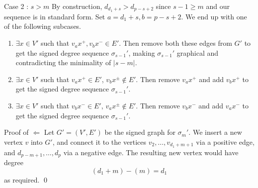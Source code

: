 \begin{frame}{Case 2 : $s > m$}
	By construction, $d_{d_1+s} > d_{p-s+2}$ since $s-1 \geq m$ and our sequence is in standard form. Set $a = d_1+s, b = p-s+2$. We end up with one of the following subcases.
	\begin{enumerate}
		\item $\exists x \in V'$ such that $v_ax^{+}, v_bx^{-} \in E'$. Then remove both these edges from $G'$ to get the signed degree sequence $\sigma_{s-1}'$, making $\sigma_{s-1}'$ graphical and contradicting the minimality of $|s - m|$.
		\item $\exists x \in V'$ such that $v_ax^{+} \in E'$, $v_bx^{\pm} \notin E'$. Then remove $v_ax^{+}$ and add $v_bx^{+}$ to get the signed degree sequence $\sigma_{s-1}'$.
		\item $\exists x \in V'$ such that $v_bx^{-} \in E'$, $v_ax^{\pm} \notin E'$. Then remove $v_bx^{-}$ and add $v_ax^{-}$ to get the signed degree sequence $\sigma_{s-1}'$.
	\end{enumerate}
\end{frame}

\begin{frame}{Proof of $\Leftarrow$}
	Let $G' = (V',E')$ be the signed graph for $\sigma_m'$. We insert a new vertex $v$ into $G'$, and connect it to the vertices $v_2,\dots,v_{d_1+m+1}$ via a positive edge, and $d_{p-m+1},\dots,d_p$ via a negative edge. The resulting new vertex would have degree
	\begin{equation*}
		(d_1+m)-(m) = d_1
	\end{equation*}
	as required. \qed
\end{frame}
